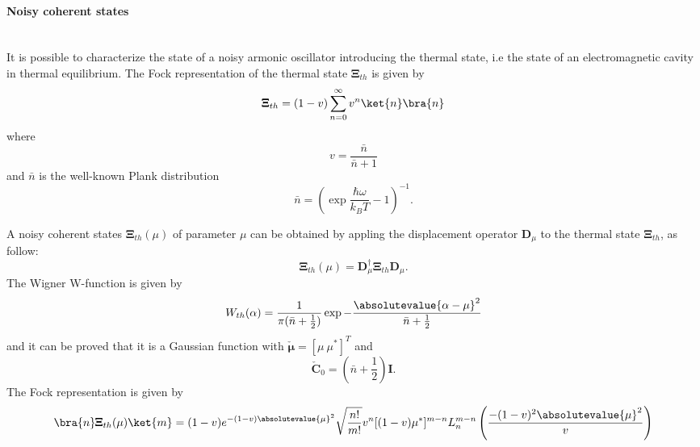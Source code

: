     \paragraph{Noisy coherent states}\mbox{} \\
        \label{par:cohState}
        It is possible to characterize the state of a noisy armonic oscillator introducing
        the thermal state, i.e the state of an electromagnetic cavity in thermal equilibrium.
        The Fock representation of the thermal state $\pmb{\Xi}_{th}$ is given by \cite{tesiGuerrini}
        \begin{equation}
            \pmb{\Xi}_{th}=(1-v)\sum_{n=0}^{\infty}v^n\ket{n}\bra{n}
        \end{equation}
        where
        \begin{equation*}
            v=\frac{\bar{n}}{\bar{n}+1}
        \end{equation*}
        and $\bar{n}$ is the well-known Plank distribution
        \begin{equation*}
            \bar{n}=\left(\exp{\frac{\hbar\omega}{k_B T}}-1\right)^{-1}.
        \end{equation*}

        A noisy coherent states $\pmb{\Xi}_{th}(\mu)$ of parameter $\mu$ can be obtained by 
        appling the displacement operator $\pmb{D}_\mu$ to the thermal state $\pmb{\Xi}_{th}$,
        as follow:
        \begin{equation}
            \pmb{\Xi}_{th}(\mu)=\pmb{D}_\mu^\dagger \pmb{\Xi}_{th} \pmb{D}_\mu.
        \end{equation}
        The Wigner W-function is given by \cite{QuantumNoise}
        \begin{equation}
            W_{th}(\alpha)=\frac{1}{\pi(\bar{n}+\frac{1}{2})}\exp{-\frac{\absolutevalue{\alpha-\mu}^2}
            {\bar{n}+\frac{1}{2}}}
        \end{equation}
        and it can be proved that it is a Gaussian function with $\check{\pmb{\mu}}=[\mu\ \mu^*]^T$
        and
        \begin{equation*}
            \check{\pmb{C}}_0=\left(\bar{n}+\frac{1}{2}\right)\pmb{I}.
        \end{equation*}
        The Fock representation is given by
        \begin{equation}
            \bra{n}\pmb{\Xi}_{th}(\mu)\ket{m}=(1-v)e^{-(1-v)\absolutevalue{\mu}^2}\sqrt{\frac{n!}{m!}}
            v^n[(1-v)\mu^*]^{m-n}L_n^{m-n}\left(\frac{-(1-v)^2\absolutevalue{\mu}^2}{v}\right)
            \label{eq:FRCS}
        \end{equation}


